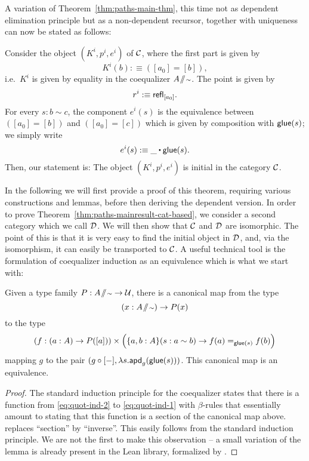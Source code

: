 A variation of Theorem~\ref{thm:paths-main-thm},
this time not as dependent elimination principle but as a non-dependent recursor,
together with uniqueness can now be stated as follows:
\begin{thm} \label{thm:paths-mainresult-cat-based}
 Consider the object $(K^i, p^i, e^i)$ of $\mathcal C$, where the first part is given by
 \begin{equation*}
  K^i (b) :\equiv ([a_0] = [b]),
 \end{equation*}
 i.e.\ $K^i$ is given by equality in the coequalizer $A \! \sslash \! {\scriptstyle \sim}$.
 The point is given by
 \begin{equation*}
  r^i :\equiv \mathsf{refl}_{[a_0]}.
 \end{equation*}
 For every $s : b \sim c$, the component $e^i(s)$ is the equivalence between $([a_0] = [b])$ 
and $([a_0] = [c])$ which is given by composition with $\mathsf{glue}(s)$;
 we simply write
 \begin{equation*}
  e^i(s) :\equiv \_ \ct \glue(s).
 \end{equation*}
 Then, our statement is: The object $(K^i, p^i, e^i)$ is initial in the category $\mathcal C$.
\end{thm}

In the following we will first provide a proof of this theorem, requiring various constructions
and lemmas,
before then deriving the dependent version.
In order to prove Theorem~\ref{thm:paths-mainresult-cat-based}, we consider
a second category which we call $\mathcal D$.
We will then show that $\mathcal C$ and $\mathcal D$ are isomorphic.
The point of this is that it is very easy to find the initial object in
$\mathcal D$, and, via the isomorphism, it can easily
be transported to $\mathcal C$.
A useful technical tool is the formulation of coequalizer induction
as an equivalence which is what we start with:
\begin{lemma}\label{lem:paths-quot-ind-equiv}
Given a type family $P : A \! \sslash \! {\scriptstyle \sim} \to \mathcal{U}$, there is a canonical map from the type
 \begin{equation}\label{eq:quot-ind-1}
  (x : A \! \sslash \! {\scriptstyle \sim}) \to P(x)
 \end{equation}
 to the type
 \begin{equation}\label{eq:quot-ind-2}
(f : (a : A) \to P([a])) \times
  \Bigl( \{a, b : A\}(s : a \sim b) \to f(a) =_{\mathsf{glue}(s)} f(b) \Bigr)
\end{equation}
 mapping $g$ to the pair $(g \circ [-], \lambda s. \mathsf{apd}_g(\mathsf{glue}(s)))$.
 This canonical map is an equivalence.
\end{lemma}
\begin{proof}
The standard induction principle for the coequalizer states that there is a function
from \eqref{eq:quot-ind-2} to \eqref{eq:quot-ind-1} with
$\beta$-rules that essentially amount to stating that this function is a
section of the canonical map above.
 replaces ``section'' by ``inverse''.
This easily follows from the standard induction principle.
We are not the first to make this observation --
a small variation of the lemma is already present in the Lean library, formalized
by \cite{floris:dependent-lemma-lean}.
\end{proof}

